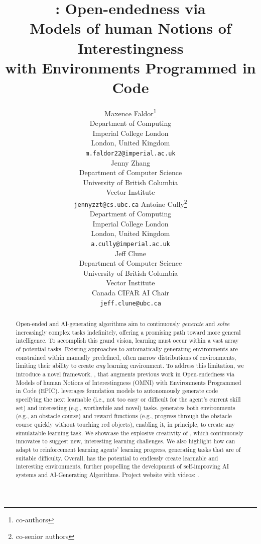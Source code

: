 \documentclass{article} %
\title{\ours{}: Open-endedness via\\Models of human Notions of Interestingness\\with Environments Programmed in Code}
\author{%
Maxence Faldor\thanks{co-authors}\\
Department of Computing\\
Imperial College London\\
London, United Kingdom\\
\texttt{m.faldor22@imperial.ac.uk} \\
\And
Jenny Zhang\footnotemark[1]\\
Department of Computer Science\\
University of British Columbia\\
Vector Institute\\
\texttt{jennyzzt@cs.ubc.ca}
\And
Antoine Cully\thanks{co-senior authors}\\
Department of Computing\\
Imperial College London\\
London, United Kingdom\\
\texttt{a.cully@imperial.ac.uk}\\
\And
Jeff Clune\footnotemark[2]\\
Department of Computer Science\\
University of British Columbia\\
Vector Institute\\
Canada CIFAR AI Chair\\
\texttt{jeff.clune@ubc.ca}\\
}
\newif\ifcomment
\begin{document}
\commentfalse



\maketitle

\begin{abstract}
Open-ended and AI-generating algorithms aim to continuously \emph{generate} and \emph{solve} increasingly complex tasks indefinitely, offering a promising path toward more general intelligence. To accomplish this grand vision, learning must occur within a vast array of potential tasks. Existing approaches to automatically generating environments are constrained within manually predefined, often narrow distributions of environments, limiting their ability to create \emph{any} learning environment. To address this limitation, we introduce a novel framework, \ours{}, that augments previous work in Open-endedness via Models of human Notions of Interestingness (OMNI) with Environments Programmed in Code (EPIC). \ours{} leverages foundation models to autonomously generate code specifying the next learnable (i.e., not too easy or difficult for the agent’s current skill set) and interesting (e.g., worthwhile and novel) tasks. \ours{} generates both environments (e.g., an obstacle course) and reward functions (e.g., progress through the obstacle course quickly without touching red objects), enabling it, in principle, to create any simulatable learning task. We showcase the explosive creativity of \ours{}, which continuously innovates to suggest new, interesting learning challenges. We also highlight how \ours{} can adapt to reinforcement learning agents’ learning progress, generating tasks that are of suitable difficulty. Overall, \ours{} has the potential to endlessly create learnable and interesting environments, further propelling the development of self-improving AI systems and AI-Generating Algorithms. Project website with videos: \website{}.
\end{abstract}

\vspace{-4pt}
\end{document}

